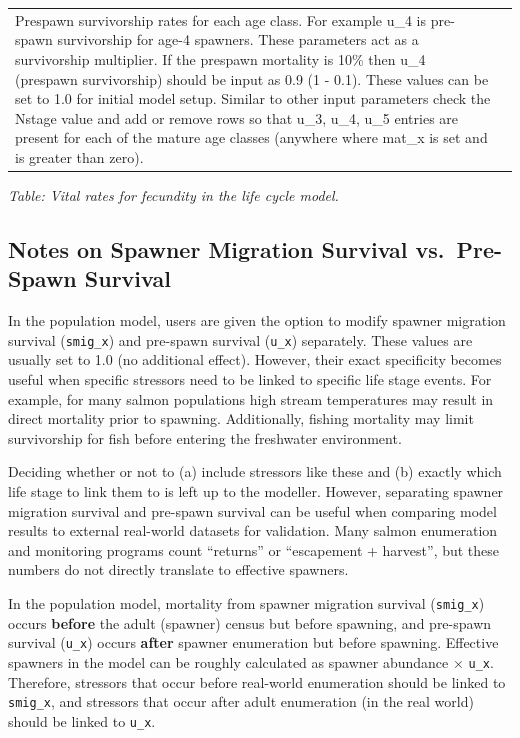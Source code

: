 \documentclass[
  letterpaper,
  DIV=11,
  numbers=noendperiod]{scrreprt}
\begin{document}
\begin{longtable}[]{@{}
  >{\raggedright\arraybackslash}p{}
  >{\raggedright\arraybackslash}p{}@{}}
Prespawn survivorship rates for each age class. For example u\_4 is
pre-spawn survivorship for age-4 spawners. These parameters act as a
survivorship multiplier. If the prespawn mortality is 10\% then u\_4
(prespawn survivorship) should be input as 0.9 (1 - 0.1). These values
can be set to 1.0 for initial model setup. Similar to other input
parameters check the Nstage value and add or remove rows so that u\_3,
u\_4, u\_5 entries are present for each of the mature age classes
(anywhere where mat\_x is set and is greater than zero). \\
\end{longtable}

\emph{Table: Vital rates for fecundity in the life cycle model.}

\subsection{Notes on Spawner Migration Survival vs.~Pre-Spawn
Survival}\label{notes-on-spawner-migration-survival-vs.-pre-spawn-survival}

In the population model, users are given the option to modify spawner
migration survival (\texttt{smig\_x}) and pre-spawn survival
(\texttt{u\_x}) separately. These values are usually set to 1.0 (no
additional effect). However, their exact specificity becomes useful when
specific stressors need to be linked to specific life stage events. For
example, for many salmon populations high stream temperatures may result
in direct mortality prior to spawning. Additionally, fishing mortality
may limit survivorship for fish before entering the freshwater
environment.

Deciding whether or not to (a) include stressors like these and (b)
exactly which life stage to link them to is left up to the modeller.
However, separating spawner migration survival and pre-spawn survival
can be useful when comparing model results to external real-world
datasets for validation. Many salmon enumeration and monitoring programs
count ``returns'' or ``escapement + harvest'', but these numbers do not
directly translate to effective spawners.

In the population model, mortality from spawner migration survival
(\texttt{smig\_x}) occurs \textbf{before} the adult (spawner) census but
before spawning, and pre-spawn survival (\texttt{u\_x}) occurs
\textbf{after} spawner enumeration but before spawning. Effective
spawners in the model can be roughly calculated as spawner abundance ×
\texttt{u\_x}. Therefore, stressors that occur before real-world
enumeration should be linked to \texttt{smig\_x}, and stressors that
occur after adult enumeration (in the real world) should be linked to
\texttt{u\_x}.
\end{document}
